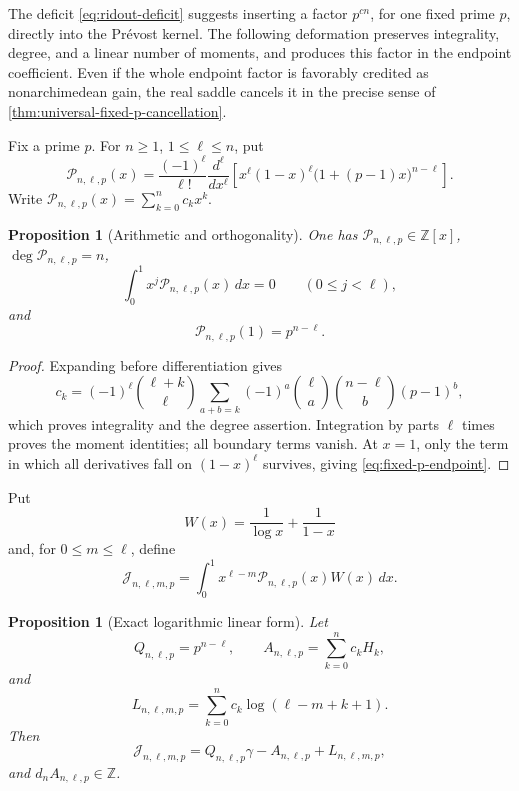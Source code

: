 \documentclass[11pt]{article}
\newtheorem{proposition}[theorem]{Proposition}
\theoremstyle{definition}
\theoremstyle{remark}
\newcommand{\Z}{\mathbb Z}
\begin{document}
The deficit \eqref{eq:ridout-deficit} suggests inserting a factor
\(p^{cn}\), for one fixed prime \(p\), directly into the Pr\'evost kernel.
The following deformation preserves integrality, degree, and a linear number
of moments, and produces this factor in the endpoint coefficient.  Even if
the whole endpoint factor is favorably credited as nonarchimedean gain, the
real saddle cancels it in the precise sense of
\cref{thm:universal-fixed-p-cancellation}.

Fix a prime \(p\).  For \(n\ge1\), \(1\le\ell\le n\), put
\begin{equation}\label{eq:fixed-p-rodrigues}
 \mathcal P_{n,\ell,p}(x)=
 \frac{(-1)^\ell}{\ell!}\frac{d^\ell}{dx^\ell}
 \left[x^\ell(1-x)^\ell
 \bigl(1+(p-1)x\bigr)^{n-\ell}\right].
\end{equation}
Write \(\mathcal P_{n,\ell,p}(x)=\sum_{k=0}^nc_kx^k\).

\begin{proposition}[Arithmetic and orthogonality]
\label{prop:fixed-p-arithmetic}
One has \(\mathcal P_{n,\ell,p}\in\Z[x]\),
\(\deg\mathcal P_{n,\ell,p}=n\),
\[
 \int_0^1x^j\mathcal P_{n,\ell,p}(x)\,dx=0
 \qquad(0\le j<\ell),
\]
and
\begin{equation}\label{eq:fixed-p-endpoint}
 \boxed{\mathcal P_{n,\ell,p}(1)=p^{n-\ell}.}
\end{equation}
\end{proposition}

\begin{proof}
Expanding before differentiation gives
\[
 c_k=(-1)^\ell\binom{\ell+k}{\ell}
 \sum_{a+b=k}(-1)^a
 \binom\ell a\binom{n-\ell}b(p-1)^b,
\]
which proves integrality and the degree assertion.  Integration by parts
\(\ell\) times proves the moment identities; all boundary terms vanish.
At \(x=1\), only the term in which all derivatives fall on
\((1-x)^\ell\) survives, giving \eqref{eq:fixed-p-endpoint}.
\end{proof}

Put
\[
 W(x)=\frac1{\log x}+\frac1{1-x}
\]
and, for \(0\le m\le\ell\), define
\begin{equation}\label{eq:fixed-p-moment}
 \mathcal J_{n,\ell,m,p}=
 \int_0^1x^{\ell-m}\mathcal P_{n,\ell,p}(x)W(x)\,dx.
\end{equation}

\begin{proposition}[Exact logarithmic linear form]
\label{prop:fixed-p-linear-form}
Let
\[
 Q_{n,\ell,p}=p^{n-\ell},
 \qquad
 A_{n,\ell,p}=\sum_{k=0}^nc_kH_k,
\]
and
\[
 L_{n,\ell,m,p}=
 \sum_{k=0}^nc_k\log(\ell-m+k+1).
\]
Then
\begin{equation}\label{eq:fixed-p-exact-form}
 \boxed{\mathcal J_{n,\ell,m,p}
 =Q_{n,\ell,p}\gamma-A_{n,\ell,p}+L_{n,\ell,m,p},}
\end{equation}
and \(d_nA_{n,\ell,p}\in\Z\).
\end{proposition}
\end{document}
